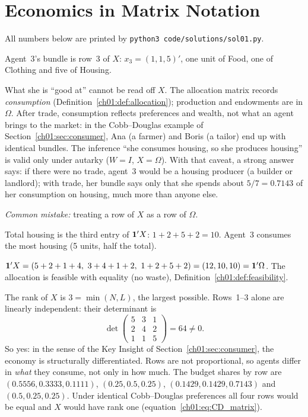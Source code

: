 \documentclass[../solutions_manual.tex]{subfiles}
\begin{document}
\ifSubfilesClassLoaded{\setcounter{chapter}{0}}{}%
\setcounter{chapter}{0}%
\chapter{Economics in Matrix Notation}\label{sol01}
\sloppy

All numbers below are printed by \texttt{python3 code/solutions/sol01.py}.


 Agent~3's bundle is row~3 of $X$: $x_3 = (1, 1, 5)'$, one unit of Food, one of Clothing and five of Housing.

What she is ``good at'' cannot be read off $X$. The allocation matrix records \emph{consumption} (Definition~\ref{ch01:def:allocation}); production and endowments are in $\Omega$. After trade, consumption reflects preferences and wealth, not what an agent brings to the market: in the Cobb--Douglas example of Section~\ref{ch01:sec:consumer}, Ana (a farmer) and Boris (a tailor) end up with identical bundles. The inference ``she consumes housing, so she produces housing'' is valid only under autarky ($W = I$, $X = \Omega$). With that caveat, a strong answer says: if there were no trade, agent~3 would be a housing producer (a builder or landlord); with trade, her bundle says only that she spends about $5/7 = 0.7143$ of her consumption on housing, much more than anyone else.

\emph{Common mistake:} treating a row of $X$ as a row of $\Omega$.

 Total housing is the third entry of $\mathbf{1}'X$: $1 + 2 + 5 + 2 = 10$. Agent~3 consumes the most housing (5 units, half the total).

 $\mathbf{1}'X = (5+2+1+4,\ 3+4+1+2,\ 1+2+5+2) = (12, 10, 10) = \mathbf{1}'\Omega$. The allocation is feasible with equality (no waste), Definition~\ref{ch01:def:feasibility}.

 The rank of $X$ is $3 = \min(N, L)$, the largest possible. Rows~1--3 alone are linearly independent: their determinant is
\[
\det\begin{pmatrix} 5 & 3 & 1 \\ 2 & 4 & 2 \\ 1 & 1 & 5 \end{pmatrix} = 64 \neq 0 .
\]
So yes: in the sense of the Key Insight of Section~\ref{ch01:sec:consumer}, the economy is structurally differentiated. Rows are not proportional, so agents differ in \emph{what} they consume, not only in how much. The budget shares by row are $(0.5556, 0.3333, 0.1111)$, $(0.25, 0.5, 0.25)$, $(0.1429, 0.1429, 0.7143)$ and $(0.5, 0.25, 0.25)$. Under identical Cobb--Douglas preferences all four rows would be equal and $X$ would have rank one (equation~\eqref{ch01:eq:CD_matrix}).
\end{document}
